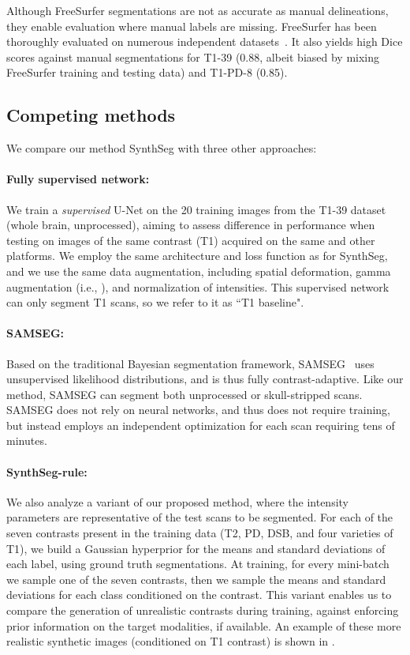 \documentclass{midl}
\newcommand{\netname}{SynthSeg}
\begin{document}
\noindent Although FreeSurfer segmentations are not as accurate as manual delineations, they enable evaluation where manual labels are missing. FreeSurfer has been thoroughly evaluated on numerous independent datasets~\cite{fischl_whole_2002, tae_validation_2008}. It also yields high Dice scores against manual segmentations for T1-39 (0.88, albeit biased by mixing FreeSurfer training and testing data) and T1-PD-8 (0.85).


\subsection{Competing methods}

We compare our method \netname{} with three other approaches:

\paragraph{Fully supervised network:} We train a \textit{supervised} U-Net on the 20 training images from the T1-39 dataset (whole brain, unprocessed), aiming to assess difference in performance when testing on images of the same contrast (T1) acquired on the same and other platforms. 
We employ the same architecture and loss function as for \netname{}, and we use the same data augmentation, including spatial deformation, gamma augmentation (i.e., ), and normalization of intensities. This supervised network can only segment T1 scans, so we refer to it as ``T1 baseline".

\paragraph{SAMSEG:}  Based on the traditional Bayesian segmentation framework, SAMSEG~\cite{puonti_fast_2016} uses unsupervised likelihood distributions, and is thus fully contrast-adaptive. Like our method, SAMSEG can segment both unprocessed or skull-stripped scans. SAMSEG does not rely on neural networks, and thus does not require training, but instead employs an independent optimization for each scan requiring tens of minutes.

\paragraph{\netname{}-rule:} We also analyze a variant of our proposed method, where the intensity parameters are representative of the test scans to be segmented. For each of the seven contrasts present in the training data (T2, PD, DSB, and four varieties of T1), we build a Gaussian hyperprior for the means and standard deviations of each label, using ground truth segmentations. At training, for every mini-batch we sample one of the seven contrasts, then we sample the means and standard deviations for each class conditioned on the contrast. This variant enables us to compare the generation of unrealistic contrasts during training, against enforcing prior information on the target modalities, if available. An example of these more realistic synthetic images (conditioned on T1 contrast) is shown in .
\end{document}
